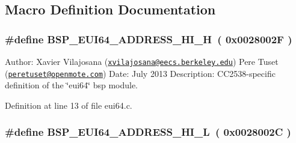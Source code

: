 \subsection{Macro Definition Documentation}
\subsubsection[{\texorpdfstring{B\+S\+P\+\_\+\+E\+U\+I64\+\_\+\+A\+D\+D\+R\+E\+S\+S\+\_\+\+H\+I\+\_\+H}{BSP_EUI64_ADDRESS_HI_H}}]{\setlength{\rightskip}{0pt plus 5cm}\#define B\+S\+P\+\_\+\+E\+U\+I64\+\_\+\+A\+D\+D\+R\+E\+S\+S\+\_\+\+H\+I\+\_\+H~( 0x0028002\+F )}\hypertarget{_open_mote-_c_c2538_2eui64_8c_a590ec65dacafcd54178dbe276712beb1}{}\label{_open_mote-_c_c2538_2eui64_8c_a590ec65dacafcd54178dbe276712beb1}
Author\+: Xavier Vilajosana (\href{mailto:xvilajosana@eecs.berkeley.edu}{\tt xvilajosana@eecs.\+berkeley.\+edu}) Pere Tuset (\href{mailto:peretuset@openmote.com}{\tt peretuset@openmote.\+com}) Date\+: July 2013 Description\+: C\+C2538-\/specific definition of the \char`\"{}eui64\char`\"{} bsp module. 

Definition at line 13 of file eui64.\+c.

\subsubsection[{\texorpdfstring{B\+S\+P\+\_\+\+E\+U\+I64\+\_\+\+A\+D\+D\+R\+E\+S\+S\+\_\+\+H\+I\+\_\+L}{BSP_EUI64_ADDRESS_HI_L}}]{\setlength{\rightskip}{0pt plus 5cm}\#define B\+S\+P\+\_\+\+E\+U\+I64\+\_\+\+A\+D\+D\+R\+E\+S\+S\+\_\+\+H\+I\+\_\+L~( 0x0028002\+C )}\hypertarget{_open_mote-_c_c2538_2eui64_8c_ae63556adeaae1be11172597756fc2a1b}{}\label{_open_mote-_c_c2538_2eui64_8c_ae63556adeaae1be11172597756fc2a1b}



